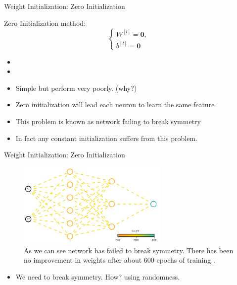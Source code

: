 \documentclass[compress,oilve,t]{beamer}
\begin{document}
\begin{frame}{Weight Initialization: Zero Initialization}
	\begin{block}{Zero Initialization method:}
		\[
		\begin{cases}
			W^{[l]} = \bm{0},\\
			b^{[l]} = \bm{0}
		\end{cases}
		\]
	\end{block}
	\begin{itemize}
		\item[]
		\item[]
		\item Simple but perform very poorly. (why?)
		\item Zero initialization will lead each neuron to learn the same feature
		\item This problem is known as network {\color{red}failing to break symmetry}
		\item In fact any constant initialization suffers from this problem.
	\end{itemize}
\end{frame}

\begin{frame}{Weight Initialization: Zero Initialization}
	\begin{figure}[H]
		\centering
		\includegraphics[width=0.65\textwidth]{Figs/zero-init.png}
		\caption{As we can see network has failed to break symmetry. There has been no improvement in weights after about 600 epochs of training \cite{katanforoosh-kunin}.}
	\end{figure}
	\begin{itemize}
		\item We need to break symmetry. How? using randomness.
	\end{itemize}
\end{frame}
\end{document}

